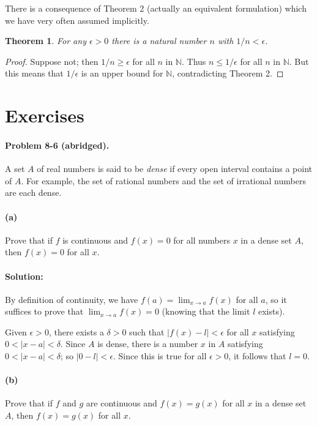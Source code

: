 \documentclass{article}
\newtheorem{theorem}{Theorem}
\begin{document}
There is a consequence of Theorem 2 (actually an equivalent formulation) which
we have very often assumed implicitly.

\begin{theorem}
  For any $\epsilon > 0$ there is a natural number $n$ with $1/n < \epsilon$.
\end{theorem}

\begin{proof}
  Suppose not; then $1/n \geq \epsilon$ for all $n$ in $\mathbb{N}$. Thus $n
  \leq 1/\epsilon$ for all $n$ in $\mathbb{N}$. But this means that
  $1/\epsilon$ is an upper bound for $\mathbb{N}$, contradicting Theorem 2.
\end{proof}

\section*{Exercises}

\paragraph{Problem 8-6 (abridged).} A set $A$ of real numbers is said to be
\emph{dense} if every open interval contains a point of $A$. For example, the
set of rational numbers and the set of irrational numbers are each dense.

\paragraph{(a)} Prove that if $f$ is continuous and $f(x) = 0$ for all numbers
$x$ in a dense set $A$, then $f(x) = 0$ for all $x$.

\paragraph{Solution:} By definition of continuity, we have $f(a) = \lim_{x
\rightarrow a}f(x)$ for all $a$, so it suffices to prove that $\lim_{x
\rightarrow a}f(x) = 0$ (knowing that the limit $l$ exists).

Given $\epsilon > 0$, there exists a $\delta > 0$ such that $|f(x) - l| <
\epsilon$ for all $x$ satisfying $0 < |x - a| < \delta$. Since $A$ is dense,
there is a number $x$ in $A$ satisfying $0 < |x - a| < \delta$; so $|0 - l| <
\epsilon$. Since this is true for all $\epsilon > 0$, it follows that $l = 0$.

\paragraph{(b)} Prove that if $f$ and $g$ are continuous and $f(x) = g(x)$ for
all $x$ in a dense set $A$, then $f(x) = g(x)$ for all $x$.
\end{document}

